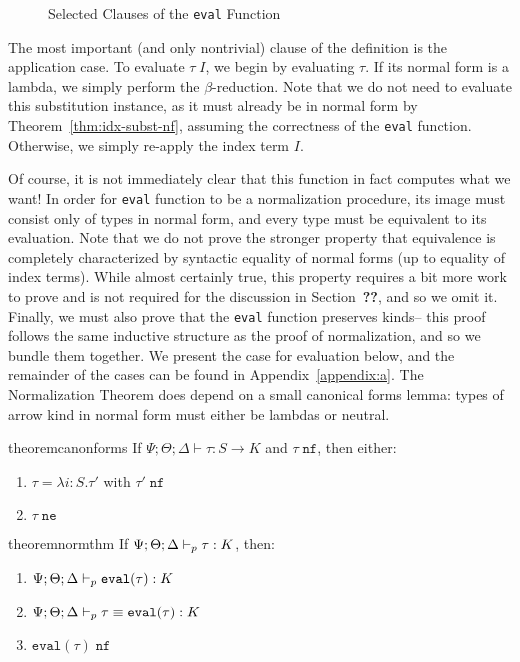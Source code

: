 \begin{figure}

\label{fig:selected-eval-rules}
\caption{Selected Clauses of the \texttt{eval} Function}
\end{figure}

The most important (and only nontrivial) clause of the definition is the application case. To evaluate $\tau \; I$, we begin by evaluating $\tau$. If its normal form
is a lambda, we simply perform the $\beta$-reduction. Note that we do not need to evaluate this substitution instance, as it must already be in normal form by Theorem~\ref{thm:idx-subst-nf}, assuming the correctness of the \texttt{eval} function. Otherwise, we simply re-apply the index term $I$.

Of course, it is not immediately clear that this function in fact computes what we want! In order for \texttt{eval} function to be a normalization procedure, its image must consist only of types in normal form, and every type must be equivalent to its evaluation. Note that we do not prove the stronger property that equivalence is completely characterized by syntactic equality of normal forms (up to equality of index terms). While almost certainly true, this property requires a bit more work to prove and is not required for the discussion in Section~\textbf{??}, and so we omit it. Finally, we must also prove that the \texttt{eval} function preserves kinds-- this proof follows the same inductive structure as the proof of normalization, and so we bundle them together. We present the case for evaluation below, and the remainder of the cases can be found in Appendix~\ref{appendix:a}. The Normalization Theorem does depend on a small canonical forms lemma: types of arrow kind in normal form must either be lambdas or neutral.

\begin{restatable}{theorem}{canonforms}
If $\Psi ; \Theta ; \Delta \vdash \tau : S \to K$ and $\tau \; \texttt{nf}$, then either:
\begin{enumerate}
  \item $\tau = \lambda i : S.\tau'$ with $\tau' \; \texttt{nf}$
  \item $\tau \; \texttt{ne}$
\end{enumerate}
\end{restatable}


\begin{restatable}{theorem}{normthm}
If $\Psi ; \Theta ; \Delta \vdash_p \tau : K$, then:
\begin{enumerate}
  \item $\Psi ; \Theta ; \Delta \vdash_p \texttt{eval}(\tau) : K$
  \item $\Psi ; \Theta ; \Delta \vdash_p \tau \equiv \texttt{eval}(\tau) : K$
  \item $\texttt{eval}(\tau) \; \texttt{nf}$
\end{enumerate}
\label{thm:norm-thm}
\end{restatable}


